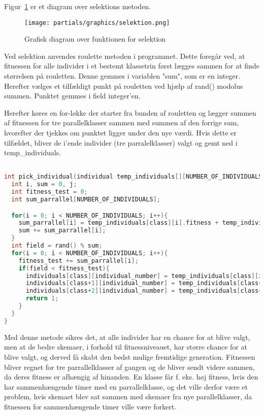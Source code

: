 Figur~\ref{fig:diagramselektion} er et diagram over selektions metoden.
\begin{figure}[!h]
\texttt{[image: partials/graphics/selektion.png]}
\caption{Grafisk diagram over funktionen for selektion}
\label{fig:diagramselektion}
\end{figure}

Ved selektion anvendes roulette metoden i programmet. Dette foregår ved, at fitnessen for alle individer i et bestemt klassetrin først lægges sammen for at finde størrelsen på rouletten. Denne gemmes i variablen "sum", som er en integer. Herefter vælges et tilfældigt punkt på rouletten ved hjælp af rand() modolus summen. Punktet gemmes i field integer'en.

Herefter køres en for-løkke der starter fra bunden af rouletten og lægger summen af fitnessen for tre parallelklasser sammen med summen af den forrige sum, hvorefter der tjekkes om punktet ligger under den nye værdi. Hvis dette er tilfældet, bliver de i'ende individer (tre parralelklasser) valgt og gemt ned i temp\_individuals.  

\begin{lstlisting}[language = c]

int pick_individual(individual temp_individuals[][NUMBER_OF_INDIVIDUALS], individual individuals[][NUMBER_OF_INDIVIDUALS], int class, int individual_number){
  int i, sum = 0, j;
  int fitness_test = 0;
  int sum_parrallel[NUMBER_OF_INDIVIDUALS];

  for(i = 0; i < NUMBER_OF_INDIVIDUALS; i++){
    sum_parrallel[i] = temp_individuals[class][i].fitness + temp_individuals[class+1][i].fitness + temp_individuals[class+2][i].fitness;
    sum += sum_parrallel[i];
  }
  int field = rand() % sum;
  for(i = 0; i < NUMBER_OF_INDIVIDUALS; i++){
    fitness_test += sum_parrallel[i];
    if(field < fitness_test){
      individuals[class][individual_number] = temp_individuals[class][i];
      individuals[class+1][individual_number] = temp_individuals[class+1][i];
      individuals[class+2][individual_number] = temp_individuals[class+2][i];
      return 1;
    }
  } 
}

\end{lstlisting}

Med denne metode sikres det, at alle individer har en chance for at blive valgt, men at de bedre skemaer, i forhold til fitnessniveauet, har større chance for at blive valgt, og derved få skabt den bedst mulige fremtidige generation. Fitnessen bliver regnet for tre parrallelklasser af gangen og de bliver sendt videre sammen, da deres fitness er afhængig af hinanden. En klasse får f. eks. høj fitness, hvis den har sammenhængende timer med en parrallelklasse, og det ville derfor være et problem, hvis skemaet blev sat sammen med skemaer fra nye parallelklasser, da fitnessen for sammenhængende timer ville være forkert.